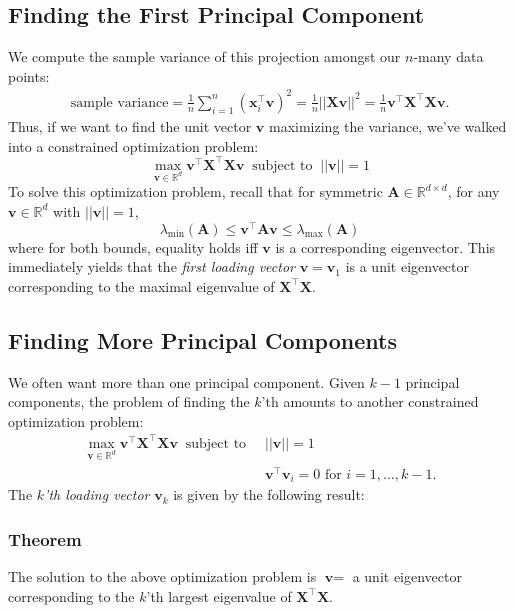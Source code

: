 \documentclass{article}
\begin{document}
\subsection*{Finding the First Principal Component}
We compute the sample variance of this projection amongst our $n$-many data points:
\begin{align*}
\text{sample variance} = \frac{1}{n}\sum_{i=1}^n (\textbf{x}_i^\top \textbf{v})^2 = \frac{1}{n}||\textbf{X}\textbf{v}||^2 = \frac{1}{n}\textbf{v}^\top \textbf{X}^\top \textbf{X} \textbf{v}.
\end{align*}
Thus, if we want to find the unit vector $\textbf{v}$ maximizing the variance, we've walked into a constrained optimization problem: 
\[
\max_{\textbf{v} \in \mathbb{R}^d} \textbf{v}^\top \textbf{X}^\top \textbf{X} \textbf{v} \:\text{ subject to } \: ||\textbf{v}|| = 1
\]
To solve this optimization problem, recall that for symmetric $\textbf{A} \in \mathbb{R}^{d \times d}$, for any $\textbf{v} \in \mathbb{R}^d$ with $||\textbf{v}|| = 1$, 
\[ 
\lambda_\text{min} (\textbf{A}) \leq \textbf{v}^\top\textbf{A}\textbf{v} \leq \lambda_\text{max}(\textbf{A})
 \]
 where for both bounds, equality holds iff $\textbf{v}$ is a corresponding eigenvector.  This  immediately yields that the \textit{first loading vector} $\textbf{v} = \textbf{v}_1$ is a unit eigenvector corresponding to the maximal eigenvalue of $\textbf{X}^\top\textbf{X}$.

\subsection*{Finding More Principal Components}
We often want more than one principal component. Given $k-1$ principal components, the problem of finding the $k$'th amounts to another constrained optimization problem: 
\begin{align*}
\max_{\textbf{v} \in \mathbb{R}^d} \textbf{v}^\top \textbf{X}^\top \textbf{X} \textbf{v} \:\text{ subject to } \: &||\textbf{v}|| = 1 \\
&\textbf{v}^\top\textbf{v}_i = 0 \text{ for } i = 1 , \hdots, k-1.
\end{align*}The \textit{$k$'th loading vector} $\textbf{v}_k$ is given by the following result:
\subsubsection*{Theorem}
The solution to the above optimization problem is $\textbf{v} = $ a unit eigenvector corresponding to the $k$'th largest eigenvalue of $\textbf{X}^\top\textbf{X}$.
\end{document}
